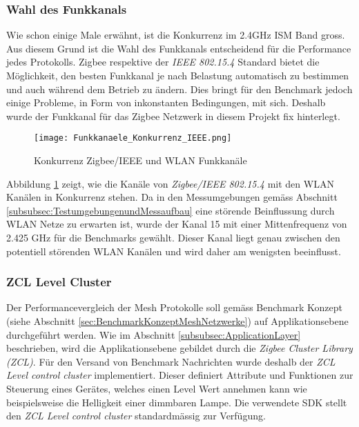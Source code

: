 \subsubsection{Wahl des Funkkanals}\label{subsubsec:FunkkanalWahlim2.4GHzISMBand}
Wie schon einige Male erwähnt, ist die Konkurrenz im 2.4GHz ISM Band gross.
Aus diesem Grund ist die Wahl des Funkkanals entscheidend für die Performance jedes Protokolls.
Zigbee respektive der \textit{IEEE 802.15.4} Standard bietet die Möglichkeit, den besten Funkkanal je nach Belastung automatisch zu bestimmen und auch während dem Betrieb zu ändern.
Dies bringt für den Benchmark jedoch einige Probleme, in Form von inkonstanten Bedingungen, mit sich.
Deshalb wurde der Funkkanal für das Zigbee Netzwerk in diesem Projekt fix hinterlegt.

\begin{figure}[h]
	\centering
	\texttt{[image: Funkkanaele\_Konkurrenz\_IEEE.png]}
	\caption{Konkurrenz Zigbee\slash IEEE und WLAN Funkkanäle \cite{markus_krause_rainer_konrad_drahtlose_2014}}
	\label{fig:ZigbeeKonkurrenzIEEEundWLANFunkkanaele}
\end{figure}

Abbildung \ref{fig:ZigbeeKonkurrenzIEEEundWLANFunkkanaele} zeigt, wie die Kanäle von \textit{Zigbee/IEEE 802.15.4} mit den WLAN Kanälen in Konkurrenz stehen.
Da in den Messumgebungen gemäss Abschnitt \ref{subsubsec:TestumgebungenundMessaufbau} eine störende Beinflussung durch WLAN Netze zu erwarten ist, wurde der Kanal 15 mit einer Mittenfrequenz von 2.425 GHz für die Benchmarks gewählt.
Dieser Kanal liegt genau zwischen den potentiell störenden WLAN Kanälen und wird daher am wenigsten beeinflusst.


\subsubsection{ZCL Level Cluster}\label{subsubsec:ZCLLevelCluster}
Der Performancevergleich der Mesh Protokolle soll gemäss Benchmark Konzept (siehe Abschnitt \ref{sec:BenchmarkKonzeptMeshNetzwerke}) auf Applikationsebene durchgeführt werden.
Wie im Abschnitt \ref{subsubsec:ApplicationLayer} beschrieben, wird die Applikationsebene gebildet durch die \textit{Zigbee Cluster Library (ZCL)}.
Für den Versand von Benchmark Nachrichten wurde deshalb der \textit{ZCL Level control cluster} implementiert.
Dieser definiert Attribute und Funktionen zur Steuerung eines Gerätes, welches einen Level Wert annehmen kann wie beispielsweise die Helligkeit einer dimmbaren Lampe.
Die verwendete SDK stellt den \textit{ZCL Level control cluster} standardmässig zur Verfügung.\cite{the_zigbee_alliance_zigbee_2016}


